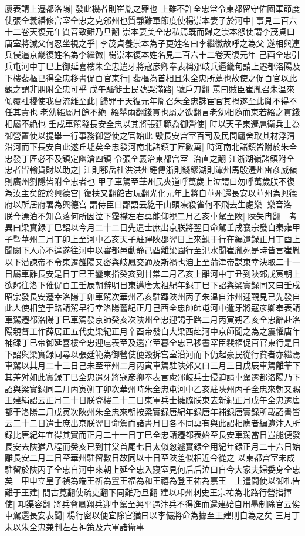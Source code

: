 屢表請上遷都洛陽|{
	發此機者則崔胤之罪也}
上雖不許全忠常令東都留守佑國軍節度使張全義繕修宫室全忠之克邠州也質靜難軍節度使楊崇本妻子於河中|{
	事見二百六十二卷天復元年質音致難乃旦翻}
崇本妻美全忠私焉既而歸之崇本怒使謂李茂貞曰唐室將滅父何忍坐視之乎|{
	李茂貞養崇本為子更姓名曰李繼徽故呼之為父}
遂相與連兵侵逼京畿復姓名為李繼徽|{
	楊崇本復本姓名見二百六十二卷天復元年}
己酉全忠引兵屯河中丁巳上御延喜樓朱全忠遣牙將寇彦卿奉表稱邠岐兵逼畿甸請上遷都洛陽及下樓裴樞已得全忠移書促百官東行|{
	裴樞為首相且朱全忠所薦也故使之促百官以此觀之謂非朋附全忠可乎}
戊午驅徙士民號哭滿路|{
	號戶刀翻}
罵曰賊臣崔胤召朱温來傾覆社稷使我曹流離至此|{
	歸罪于天復元年胤召朱全忠誅宦官其禍遂至此胤不得不任其責也}
老幼繦屬月餘不絶|{
	繦舉兩翻錢貫也屬之欲翻言老幼相隨而東若繦之貫錢相屬不絶也}
壬戌車駕發長安全忠以其將張廷範為御營使|{
	時以天子東遷扈衛兵士為御營置使以提舉一行事務御營使之官始此}
毁長安宫室百司及民間廬舍取其材浮渭沿河而下長安自此遂丘墟矣全忠發河南北諸鎮丁匠數萬|{
	時河南北諸鎮皆附於朱全忠發丁匠必不及鎮定幽滄四鎮}
令張全義治東都宫室|{
	治直之翻}
江浙湖嶺諸鎮附全忠者皆輸貨財以助之|{
	江則鄂岳杜洪洪州鍾傳浙則錢鏐湖則潭州馬殷澧州雷彦威嶺則廣州劉隱皆附全忠者也}
甲子車駕至華州民夾道呼萬歲上泣謂曰勿呼萬歲朕不復為汝主矣館於興德宫|{
	復扶又翻館古玩翻光化元年上將自華州還長安以華州為興德府以所居府署為興德宫}
謂侍臣曰鄙語云紇干山頭凍殺雀何不飛去生處樂|{
	樂音洛}
朕今漂泊不知竟落何所因泣下霑襟左右莫能仰視二月乙亥車駕至陜|{
	陜失冉翻　考異曰梁實録丁巳詔以今月二十二日先遣士庶出京朕將翌日命駕壬戌襄宗發自秦雍甲子暨華州二月丁卯上至河中乙亥天子駐蹕陜郡翌日上來覲于行在編遺録正月丁酉上聞闕下人心不遑遂往河中以審都邑動静己酉離梁園行至汜水聞崔胤死是時皆言崔胤以下潜諫帝不令東遷雒陽又密與岐鳳交通及斯禍也洎上至蒲津帝謀東幸決取二十一日屬車離長安是日丁巳王鑾東指癸亥到甘棠二月乙亥上離河中丁丑到陜郊戊寅朝上欲躬往洛下催促百工壬辰朝辭明日東邁唐太祖紀年録丁巳下詔與梁實録同又曰壬戌昭宗發長安遷幸洛陽丁卯車駕次華州乙亥駐蹕陜州丙子朱温自汴州迎覲見已先發自此人使相望于路請駕早行幸洛陽舊紀正月己酉全忠帥師屯河中遣牙將寇彦卿奉表請車駕遷都洛陽丁巳車駕發京師癸亥次陜州全忠迎謁于路二月丙寅朔乙亥全忠辭赴洛陽親督工作薛居正五代史梁紀正月辛酉帝發自大梁西赴河中京師聞之為之震懼唐年補録丁巳帝御延喜樓全忠迎扈表至及還宫至暮全忠已移書宰臣裴樞促百官東行是日下詔與梁實録同尋以張廷範為御營使便毁拆宫室沿河而下仍起豪民從行貧者亦繼焉車駕以其月二十三日己未至華州二月丙寅車駕駐陜郊又曰三月三日戊辰車駕離華下其差舛如此實録丁巳全忠遣牙將寇彦卿奉表言慮邠岐兵士侵迫請車駕遷都洛陽乃下詔與梁實録同二月丙寅朔丁卯次華州時朱全忠屯河中乙亥駐陜州丙子全忠來朝又賜王建絹詔云正月二十日朕登樓二十二日東軍兵士擁脇朕東去新紀正月戊午全忠遷唐都于洛陽二月戊寅次陜州朱全忠來朝按梁實録唐紀年録唐年補録唐實録所載詔書皆云二十二日遣士庶出京朕翌日命駕而諸書月日各不同莫有與此詔相應者編遺汴人所録比唐紀年宜得其實而正月二十一日丁巳全忠請遷都表始至長安車駕當日豈能便發長安去陜猶八程而癸亥已到甘棠首尾七日太似怱遽實録全用紀年録正月二十六日始離長安二月二日至華州駐留數日故同以十日至陜差似相近今從之}
以東都宫室未成駐留於陜丙子全忠自河中來朝上延全忠入寢室見何后后泣曰自今大家夫婦委身全忠矣　甲申立皇子禎為端王祈為豐王福為和王禧為登王祐為嘉王　上遣間使以御札告難于王建|{
	間古莧翻使疏吏翻下同難乃旦翻}
建以卭州刺史王宗祐為北路行營指揮使|{
	卭渠容翻}
將兵會鳳翔兵迎車駕至興平遇汴兵不得進而還建始自用墨制除官云俟車駕還長安表聞|{
	楊行密以便宜除官猶曰以李儼將命為據至王建則自為之矣}
三月丁未以朱全忠兼判左右神策及六軍諸衛事

